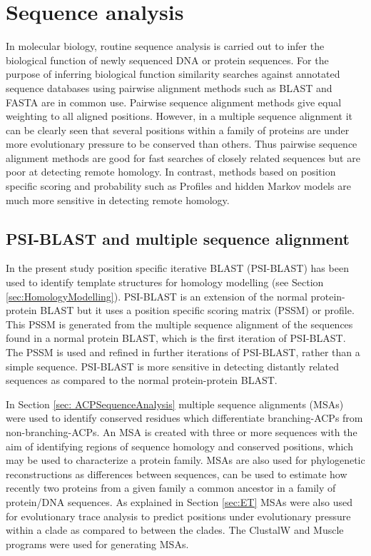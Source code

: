 	\section{Sequence analysis}
	\label{sec:SequenceAnalysis}
	In molecular biology, routine sequence analysis is carried out to infer the biological function of newly sequenced DNA or protein sequences. For the purpose of inferring biological function similarity searches against annotated sequence databases using pairwise alignment methods such as BLAST and FASTA are in common use. Pairwise sequence alignment methods give equal weighting to all aligned positions. However, in a multiple sequence alignment it can be clearly seen that several positions within a family of proteins are under more evolutionary pressure to be conserved than others. Thus pairwise sequence alignment methods are good for fast searches of closely related sequences but are poor at detecting remote homology. In contrast, methods based on position specific scoring and probability such as Profiles and hidden Markov models are much more sensitive in detecting remote homology. 
		
		\subsection{PSI-BLAST and multiple sequence alignment}
		\label{sec:PSIBlastAndMSA}
		In the present study position specific iterative BLAST (PSI-BLAST) has been used to identify template structures for homology modelling (see Section \ref{sec:HomologyModelling}). PSI-BLAST is an extension of the normal protein-protein BLAST but it uses a position specific scoring matrix (PSSM) or profile. This PSSM is generated from the multiple sequence alignment of the sequences found in a normal protein BLAST, which is the first iteration of PSI-BLAST. The PSSM is used and refined in further iterations of PSI-BLAST, rather than a simple sequence. PSI-BLAST is more sensitive in detecting distantly related sequences as compared to the normal protein-protein BLAST. 
		
		In Section \ref{sec: ACPSequenceAnalysis} multiple sequence alignments (MSAs) were used to identify conserved residues which differentiate branching-ACPs from non-branching-ACPs. An MSA is created with three or more sequences with the aim of identifying regions of sequence homology and conserved positions, which may be used to characterize a protein family. MSAs are also used for phylogenetic reconstructions as differences between sequences, can be used to estimate how recently two proteins from a given family a common ancestor in a family of protein/DNA sequences. As explained in Section \ref{sec:ET} MSAs were also used for evolutionary trace analysis to predict positions under evolutionary pressure within a clade as compared to between the clades. The ClustalW and Muscle programs were used for generating MSAs.
		
